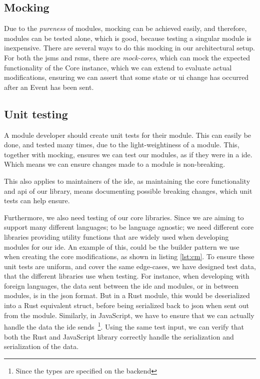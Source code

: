 \subsection{Mocking}

Due to the \textit{pureness} of modules, mocking can be achieved easily, and
therefore, modules can be tested alone, which is good, because testing a
singular module is inexpensive. There are several ways to do this mocking in our
architectural setup. For both the \gls*{jsms} and \gls*{rsms}, there are
\textit{mock-cores}, which can mock the expected functionality of the Core
instance, which we can extend to evaluate actual modifications, ensuring we can
assert that some state or \gls*{ui} change has occurred after an Event has been
sent.

\subsection{Unit testing}

A module developer should create unit tests for their module. This can easily be
done, and tested many times, due to the light-weightiness of a module. This,
together with mocking, ensures we can test our modules, as if they were in a
\gls*{ide}. Which means we can ensure changes made to a module is non-breaking.

This also applies to maintainers of the \gls*{ide}, as maintaining the core
functionality and \gls*{api} of our library, means documenting possible breaking
changes, which unit tests can help ensure.

Furthermore, we also need testing of our core libraries. Since we are aiming to
support many different languages; to be language agnostic; we need different core
libraries providing utility functions that are widely used when developing
modules for our \gls{ide}. An example of this, could be the builder pattern we
use when creating the core modifications, as shown in listing \ref{lst:cm}.
To ensure these unit tests are uniform, and cover the same edge-cases, we have
designed test data, that the different libraries use when testing. For instance,
when developing with foreign languages, the data sent between the \gls{ide} and
modules, or in between modules, is in the \gls{json} format. But in a Rust
module, this would be deserialized into a Rust equivalent struct, before being
serialized back to \gls{json} when sent out from the module. Similarly, in
JavaScript, we have to ensure that we can actually handle the data the \gls{ide}
sends~\footnote{Since the types are specified on the backend}. Using the same
test input, we can verify that both the Rust and JavaScript library correctly
handle the serialization and serialization of the data.

